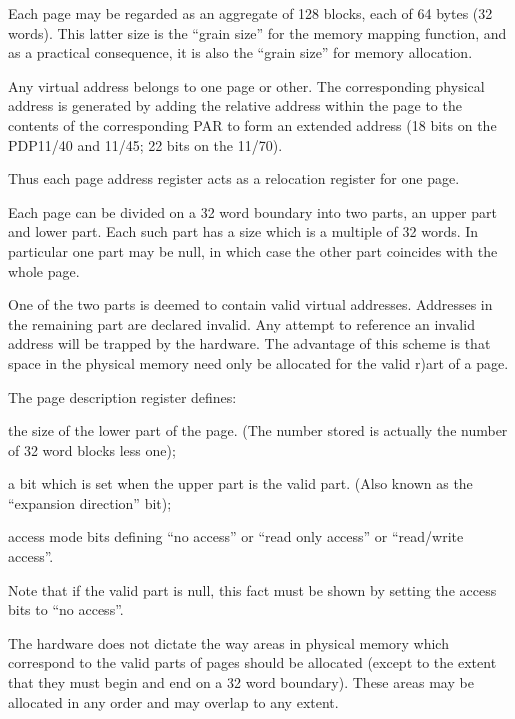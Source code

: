 Each page may be regarded as an aggregate
of 128 blocks, each of 64 bytes
(32 words). This latter size is the
``grain size'' for the memory mapping
function, and as a practical consequence,
it is also the ``grain size'' for
memory allocation.

Any virtual address belongs to one page
or other. The corresponding physical
address is generated by adding the
relative address within the page to the
contents of the corresponding PAR to
form an extended address (18 bits on
the PDP11/40 and 11/45; 22 bits on the
11/70).

Thus each page address register acts as
a relocation register for one page.

Each page can be divided on a 32 word
boundary into two parts, an upper part
and lower part. Each such part has a
size which is a multiple of 32 words.
In particular one part may be null, in
which case the other part coincides
with the whole page.

One of the two parts is deemed to contain
valid virtual addresses. Addresses
in the remaining part are declared
invalid. Any attempt to reference an
invalid address will be trapped by the
hardware. The advantage of this scheme
is that space in the physical memory
need only be allocated for the valid
r)art of a page.



The page description register defines:

\bd
\item[(a)] the size of the lower part of
the page. (The number stored is
actually the number of 32 word
blocks less one);

\item[(b)] a bit which is set when the
upper part is the valid part.
(Also known as the ``expansion
direction'' bit);

\item[(c)] access mode bits defining ``no
access'' or ``read only access'' or
``read/write access''.
\ed

Note that if the valid part is null,
this fact must be shown by setting the
access bits to ``no access''.


The hardware does not dictate the way
areas in physical memory which
correspond to the valid parts of pages
should be allocated (except to the
extent that they must begin and end on
a 32 word boundary). These areas may be
allocated in any order and may overlap
to any extent.

